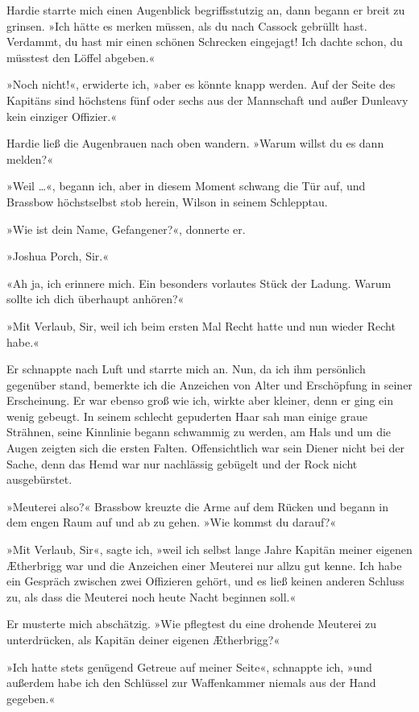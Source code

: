 Hardie starrte mich einen Augenblick begriffsstutzig an, dann
begann er breit zu grinsen. »Ich hätte es merken müssen, als du
nach Cassock gebrüllt hast. Verdammt, du hast mir einen schönen
Schrecken eingejagt! Ich dachte schon, du müsstest den Löffel
abgeben.«

»Noch nicht!«, erwiderte ich, »aber es könnte knapp werden. Auf der
Seite des Kapitäns sind höchstens fünf oder sechs aus der
Mannschaft und außer Dunleavy kein einziger Offizier.«

Hardie ließ die Augenbrauen nach oben wandern. »Warum willst du es
dann melden?«

»Weil \ldots{}«, begann ich, aber in diesem Moment schwang die Tür auf,
und Brassbow höchstselbst stob herein, Wilson in seinem
Schlepptau.

»Wie ist dein Name, Gefangener?«, donnerte er.

»Joshua Porch, Sir.«

«Ah ja, ich erinnere mich. Ein besonders vorlautes Stück der
Ladung. Warum sollte ich dich überhaupt anhören?«

»Mit Verlaub, Sir, weil ich beim ersten Mal Recht hatte und nun
wieder Recht habe.«

Er schnappte nach Luft und starrte mich an. Nun, da ich ihm
persönlich gegenüber stand, bemerkte ich die Anzeichen von Alter
und Erschöpfung in seiner Erscheinung. Er war ebenso groß wie ich,
wirkte aber kleiner, denn er ging ein wenig gebeugt. In seinem
schlecht gepuderten Haar sah man einige graue Strähnen, seine
Kinnlinie begann schwammig zu werden, am Hals und um die Augen
zeigten sich die ersten Falten. Offensichtlich war sein Diener
nicht bei der Sache, denn das Hemd war nur nachlässig gebügelt und
der Rock nicht ausgebürstet.

»Meuterei also?« Brassbow kreuzte die Arme auf dem Rücken und
begann in dem engen Raum auf und ab zu gehen. »Wie kommst du
darauf?«

»Mit Verlaub, Sir«, sagte ich, »weil ich selbst lange Jahre Kapitän
meiner eigenen Ætherbrigg war und die Anzeichen einer Meuterei nur
allzu gut kenne. Ich habe ein Gespräch zwischen zwei Offizieren
gehört, und es ließ keinen anderen Schluss zu, als dass die
Meuterei noch heute Nacht beginnen soll.«

Er musterte mich abschätzig. »Wie pflegtest du eine drohende
Meuterei zu unterdrücken, als Kapitän deiner eigenen Ætherbrigg?«

»Ich hatte stets genügend Getreue auf meiner Seite«, schnappte ich,
»und außerdem habe ich den Schlüssel zur Waffenkammer niemals aus
der Hand gegeben.«

